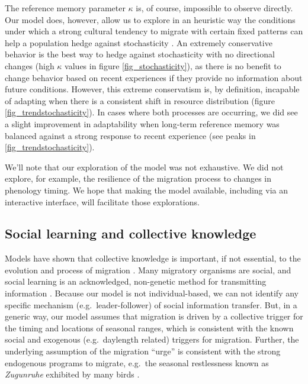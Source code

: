\documentclass[utf8]{frontiersSCNS} %
\begin{document}
	The reference memory parameter $\kappa$ is, of course, impossible to observe directly. Our model does, however, allow us to explore in an heuristic way the conditions under which a strong cultural tendency to migrate with certain fixed patterns can help a population hedge against stochasticity \citep{Abrahms2019,Fagan2019b}.  An extremely conservative behavior is the best way to hedge against stochasticity with no directional changes (high $\kappa$ values in figure \ref{fig_stochasticity}), as there is no benefit to change behavior based on recent experiences if they provide no information about future conditions. However, this extreme conservatism is, by definition, incapable of adapting when there is a consistent shift in resource distribution (figure \ref{fig_trendstochasticity}).  In cases where both processes are occurring, we did see a slight improvement in adaptability when long-term reference memory was balanced against a strong response to recent experience (see peaks in \ref{fig_trendstochasticity}). 
	
	We'll note that our exploration of the model was not exhaustive. We did not explore, for example, the resilience of the migration process to changes in phenology timing. We hope that making the model available, including via an interactive interface, will facilitate those explorations.  
	 
	
\subsection{Social learning and collective knowledge}	
	
	Models have shown that collective knowledge is important, if not essential, to the evolution and process of migration \citep{Shaw2013, Guttal2010, Berdahl2018}. Many migratory organisms are social, and social learning is an acknowledged, non-genetic method for transmitting information \citep{Kashetsky}.  Because our model is not individual-based, we can not identify any specific mechanism (e.g.~leader-follower) of social information transfer.  But, in a generic way, our model assumes that migration is driven by a collective trigger for the timing and locations of seasonal ranges, which is consistent with the known social and exogenous (e.g.~daylength related) triggers for migration. Further, the underlying assumption of the migration ``urge'' is consistent with the strong endogenous programs to migrate, e.g.~the seasonal restlessness known as \emph{Zugunruhe}  exhibited by many birds \citep{Berthold1999, Helm2006}.
	
\end{document}
